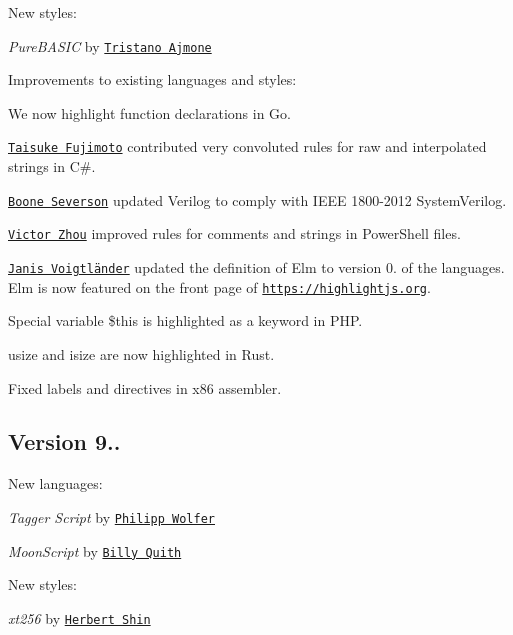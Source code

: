 New styles\+:


\begin{DoxyItemize}
\item {\itshape Pure\+B\+A\+S\+IC} by \href{https://github.com/tajmone}{\tt Tristano Ajmone}
\end{DoxyItemize}

Improvements to existing languages and styles\+:


\begin{DoxyItemize}
\item We now highlight function declarations in Go.
\item \href{https://github.com/temp-impl}{\tt Taisuke Fujimoto} contributed very convoluted rules for raw and interpolated strings in C\#.
\item \href{https://github.com/BooneJS}{\tt Boone Severson} updated Verilog to comply with I\+E\+EE 1800-\/2012 System\+Verilog.
\item \href{https://github.com/OiCMudkips}{\tt Victor Zhou} improved rules for comments and strings in Power\+Shell files.
\item \href{https://github.com/jvoigtlaender}{\tt Janis Voigtländer} updated the definition of Elm to version 0. of the languages. Elm is now featured on the front page of \href{https://highlightjs.org}{\tt https\+://highlightjs.\+org}.
\item Special variable {\ttfamily \$this} is highlighted as a keyword in P\+HP.
\item {\ttfamily usize} and {\ttfamily isize} are now highlighted in Rust.
\item Fixed labels and directives in x86 assembler.
\end{DoxyItemize}

\subsection*{Version 9..}

New languages\+:


\begin{DoxyItemize}
\item {\itshape Tagger Script} by \href{https://github.com/phw}{\tt Philipp Wolfer}
\item {\itshape Moon\+Script} by \href{https://github.com/billyquith}{\tt Billy Quith}
\end{DoxyItemize}

New styles\+:


\begin{DoxyItemize}
\item {\itshape xt256} by \href{https://github.com/initbar}{\tt Herbert Shin}
\end{DoxyItemize}

